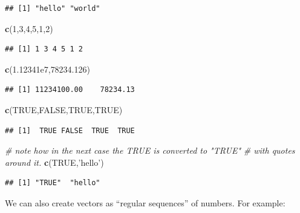 \documentclass[]{article}
\newenvironment{Shaded}{\begin{snugshade}}{\end{snugshade}}
\newcommand{\KeywordTok}[1]{\textcolor[rgb]{0.13,0.29,0.53}{\textbf{#1}}}
\newcommand{\DecValTok}[1]{\textcolor[rgb]{0.00,0.00,0.81}{#1}}
\newcommand{\FloatTok}[1]{\textcolor[rgb]{0.00,0.00,0.81}{#1}}
\newcommand{\StringTok}[1]{\textcolor[rgb]{0.31,0.60,0.02}{#1}}
\newcommand{\CommentTok}[1]{\textcolor[rgb]{0.56,0.35,0.01}{\textit{#1}}}
\newcommand{\OtherTok}[1]{\textcolor[rgb]{0.56,0.35,0.01}{#1}}
\newcommand{\NormalTok}[1]{#1}
\theoremstyle{definition}
\theoremstyle{definition}
\theoremstyle{remark}
\begin{document}
\begin{verbatim}
## [1] "hello" "world"
\end{verbatim}

\begin{Shaded}
\begin{Highlighting}[]
\KeywordTok{c}\NormalTok{(}\DecValTok{1}\NormalTok{,}\DecValTok{3}\NormalTok{,}\DecValTok{4}\NormalTok{,}\DecValTok{5}\NormalTok{,}\DecValTok{1}\NormalTok{,}\DecValTok{2}\NormalTok{)}
\end{Highlighting}
\end{Shaded}

\begin{verbatim}
## [1] 1 3 4 5 1 2
\end{verbatim}

\begin{Shaded}
\begin{Highlighting}[]
\KeywordTok{c}\NormalTok{(}\FloatTok{1.12341e7}\NormalTok{,}\FloatTok{78234.126}\NormalTok{)}
\end{Highlighting}
\end{Shaded}

\begin{verbatim}
## [1] 11234100.00    78234.13
\end{verbatim}

\begin{Shaded}
\begin{Highlighting}[]
\KeywordTok{c}\NormalTok{(}\OtherTok{TRUE}\NormalTok{,}\OtherTok{FALSE}\NormalTok{,}\OtherTok{TRUE}\NormalTok{,}\OtherTok{TRUE}\NormalTok{)}
\end{Highlighting}
\end{Shaded}

\begin{verbatim}
## [1]  TRUE FALSE  TRUE  TRUE
\end{verbatim}

\begin{Shaded}
\begin{Highlighting}[]
\CommentTok{# note how in the next case the TRUE is converted to "TRUE"}
\CommentTok{# with quotes around it.}
\KeywordTok{c}\NormalTok{(}\OtherTok{TRUE}\NormalTok{,}\StringTok{'hello'}\NormalTok{)}
\end{Highlighting}
\end{Shaded}

\begin{verbatim}
## [1] "TRUE"  "hello"
\end{verbatim}

We can also create vectors as ``regular sequences'' of numbers. For
example:
\end{document}
